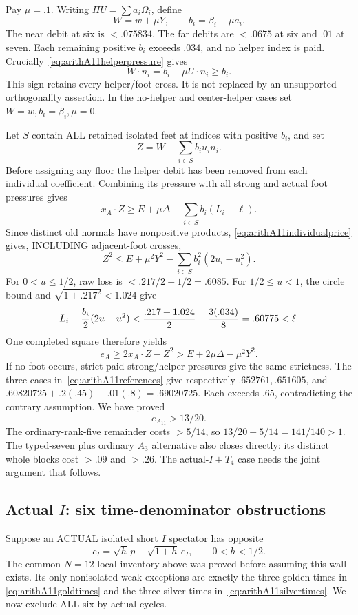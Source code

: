 \documentclass[11pt]{article}
\begin{document}
Pay \(\mu=.1\).
Writing \(\Pi U=\sum a_i\Omega_i\), define
\[
 W=w+\mu Y,\qquad b_i=\beta_i-\mu a_i .
\]
The near debit at six is \(<.075834\).
The far debits are \(<.0675\) at six and
\(.01\) at seven.
Each remaining positive \(b_i\) exceeds
\(.034\), and no helper index is paid.
Crucially~\eqref{eq:arithA11helperpressure} gives
\[
                  W\cdot n_i=b_i+\mu U\cdot n_i\ge b_i.
\tag{A11price}\label{eq:arithA11individualprice}
\]
This sign retains every helper/foot cross.
It is not replaced by an unsupported
orthogonality assertion.
In the no-helper and center-helper cases set
\(W=w,b_i=\beta_i,\mu=0\).

Let \(S\) contain ALL retained isolated feet
at indices with positive \(b_i\), and set
\[
                  Z=W-\sum_{i\in S}b_i u_i n_i .
\]
Before assigning any floor the helper debit
has been removed from each individual
coefficient.  Combining its pressure with
all strong and actual foot pressures gives
\[
 x_A\cdot Z\ge E+\mu\Delta
                    -\sum_{i\in S}b_i(L_i-\ell).
\]
Since distinct old normals have nonpositive
products, \eqref{eq:arithA11individualprice}
gives, INCLUDING adjacent-foot crosses,
\[
 Z^2\le E+\mu^2Y^2
                    -\sum_{i\in S}b_i^2(2u_i-u_i^2).
\]
For \(0<u\le1/2\), raw loss is
\(<.217/2+1/2=.6085\).
For \(1/2\le u<1\), the circle bound and
\(\sqrt{1+.217^2}<1.024\) give
\[
 L_i-\frac{b_i}{2}(2u-u^2)
 <{.217+1.024\over2}-{3(.034)\over8}
 =.60775<\ell .
\]
One completed square therefore yields
\[
 e_A\ge2x_A\cdot Z-Z^2
                      >E+2\mu\Delta-\mu^2Y^2 .
\]
If no foot occurs, strict paid strong/helper
pressures give the same strictness.
The three cases in~\eqref{eq:arithA11references}
give respectively
\(.652761,.651605\), and
\(.60820725+.2(.45)-.01(.8)=.69020725\).
Each exceeds \(.65\), contradicting the
contrary assumption.  We have proved
\[
                            e_{A_{11}}>13/20 .
\tag{A11Urate}\label{eq:arithA11uniform}
\]
The ordinary-rank-five remainder costs \(>5/14\),
so \(13/20+5/14=141/140>1\).
The typed-seven plus ordinary \(A_3\) alternative
also closes directly: its distinct whole
blocks cost \(>.09\) and \(>.26\).
The actual-\(I+T_4\) case needs the joint
argument that follows.

\subsection{Actual \(I\): six time-denominator obstructions}
\label{app:arithA11Itimes}

Suppose an ACTUAL isolated short \(I\) spectator
has opposite
\[
 c_I=\sqrt h\,p-\sqrt{1+h}\,e_I,\qquad 0<h<1/2 .
\]
The common \(N=12\) local inventory above
was proved before assuming this wall exists.
Its only nonisolated weak exceptions are
exactly the three golden times in
\eqref{eq:arithA11goldtimes} and the three
silver times in~\eqref{eq:arithA11silvertimes}.
We now exclude ALL six by actual cycles.
\end{document}
